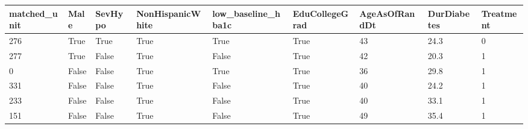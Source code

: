 \begin{tabular}{p{1.5cm}|p{1.5cm}|p{1.5cm}|p{1.5cm}|p{1.5cm}|p{1.5cm}|p{1.5cm}|p{1.5cm}|p{1.5cm}|}
\toprule
 matched_unit &  Male &  SevHypo &  NonHispanicWhite &  low_baseline_hba1c &  EduCollegeGrad &  AgeAsOfRandDt &  DurDiabetes &  Treatment \\
\midrule
          276 &  True &     True &              True &                True &            True &             43 &         24.3 &          0 \\
          277 &  True &    False &              True &               False &            True &             42 &         20.3 &          1 \\
            0 & False &    False &              True &                True &            True &             36 &         29.8 &          1 \\
          331 & False &    False &              True &               False &            True &             40 &         24.2 &          1 \\
          233 & False &    False &              True &               False &            True &             40 &         33.1 &          1 \\
          151 & False &    False &              True &               False &            True &             49 &         35.4 &          1 \\
\bottomrule
\end{tabular}
